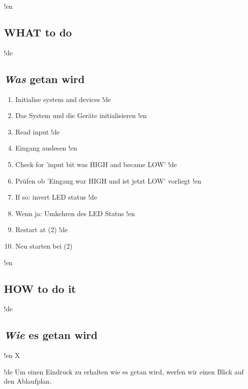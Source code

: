 !en \subsection{WHAT to do}
!de \subsection{\textit{Was} getan wird}

\begin{enumerate}
!en   \item Initialise system and devices
!de   \item Das System und die Geräte initialisieren
!en   \item Read input
!de   \item Eingang auslesen
!en   \item Check for 'input bit was HIGH and became LOW'
!de   \item Prüfen ob 'Eingang war HIGH und ist jetzt LOW' vorliegt
!en   \item If so: invert LED status
!de   \item Wenn ja: Umkehren des LED Status
!en   \item Restart at (2)
!de   \item Neu starten bei (2)
\end{enumerate}



!en \subsection{HOW to do it}
!de \subsection{\textit{Wie} es getan wird}



!en X

!de Um einen Eindruck zu erhalten wie es getan wird, werfen wir einen Blick auf den Ablaufplan.

